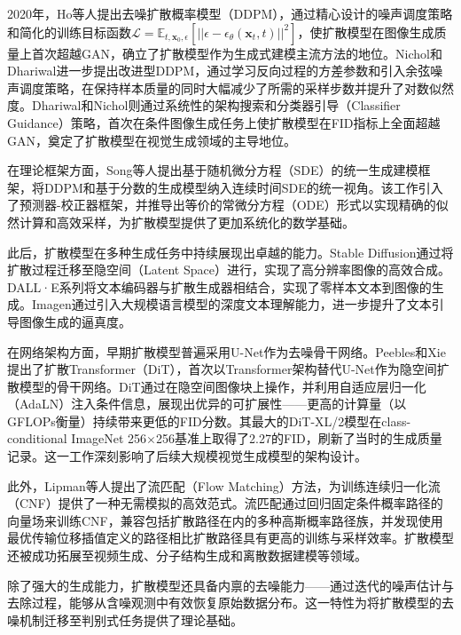 2020年，Ho等人\cite{ho2020denoising}提出去噪扩散概率模型（DDPM），通过精心设计的噪声调度策略和简化的训练目标函数$\mathcal{L} = \mathbb{E}_{t, \mathbf{x}_0, \epsilon}[||\epsilon - \epsilon_\theta(\mathbf{x}_t, t)||^2]$，使扩散模型在图像生成质量上首次超越GAN，确立了扩散模型作为生成式建模主流方法的地位。Nichol和Dhariwal\cite{nichol2021improved}进一步提出改进型DDPM，通过学习反向过程的方差参数和引入余弦噪声调度策略，在保持样本质量的同时大幅减少了所需的采样步数并提升了对数似然度。Dhariwal和Nichol\cite{dhariwal2021diffusion}则通过系统性的架构搜索和分类器引导（Classifier Guidance）策略，首次在条件图像生成任务上使扩散模型在FID指标上全面超越GAN，奠定了扩散模型在视觉生成领域的主导地位。

在理论框架方面，Song等人\cite{song2021score}提出基于随机微分方程（SDE）的统一生成建模框架，将DDPM和基于分数的生成模型纳入连续时间SDE的统一视角。该工作引入了预测器-校正器框架，并推导出等价的常微分方程（ODE）形式以实现精确的似然计算和高效采样，为扩散模型提供了更加系统化的数学基础。

此后，扩散模型在多种生成任务中持续展现出卓越的能力。Stable Diffusion\cite{rombach2022high}通过将扩散过程迁移至隐空间（Latent Space）进行，实现了高分辨率图像的高效合成。DALL·E\cite{ramesh2021zero}系列将文本编码器与扩散生成器相结合，实现了零样本文本到图像的生成。Imagen\cite{saharia2022photorealistic}通过引入大规模语言模型的深度文本理解能力，进一步提升了文本引导图像生成的逼真度。

在网络架构方面，早期扩散模型普遍采用U-Net作为去噪骨干网络。Peebles和Xie\cite{peebles2023scalable}提出了扩散Transformer（DiT），首次以Transformer架构替代U-Net作为隐空间扩散模型的骨干网络。DiT通过在隐空间图像块上操作，并利用自适应层归一化（AdaLN）注入条件信息，展现出优异的可扩展性——更高的计算量（以GFLOPs衡量）持续带来更低的FID分数。其最大的DiT-XL/2模型在class-conditional ImageNet 256$\times$256基准上取得了2.27的FID，刷新了当时的生成质量记录。这一工作深刻影响了后续大规模视觉生成模型的架构设计。

此外，Lipman等人\cite{lipman2023flow}提出了流匹配（Flow Matching）方法，为训练连续归一化流（CNF）提供了一种无需模拟的高效范式。流匹配通过回归固定条件概率路径的向量场来训练CNF，兼容包括扩散路径在内的多种高斯概率路径族，并发现使用最优传输位移插值定义的路径相比扩散路径具有更高的训练与采样效率。扩散模型还被成功拓展至视频生成\cite{ho2022imagen}、分子结构生成\cite{hoogeboom2022equivariant}和离散数据建模\cite{gu2022vector}等领域。

除了强大的生成能力，扩散模型还具备内禀的去噪能力——通过迭代的噪声估计与去除过程，能够从含噪观测中有效恢复原始数据分布\cite{10419041}。这一特性为将扩散模型的去噪机制迁移至判别式任务提供了理论基础。

